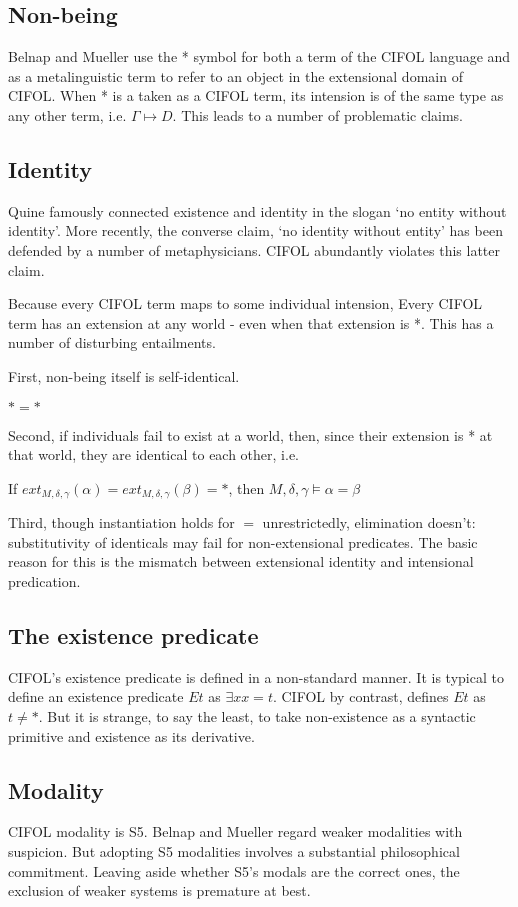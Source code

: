 \documentclass[]{article}
\begin{document}
\subsection{Non-being}
Belnap and Mueller use the * symbol for both a term of the CIFOL language and as a metalinguistic term to refer to an object in the extensional domain of CIFOL. When * is a taken as a CIFOL term, its intension is of the same type as any other term, i.e. $\Gamma \mapsto D$. This leads to a number of problematic claims. 

\subsection{Identity}
Quine famously connected existence and identity in the slogan `no entity without identity'. More recently, the converse claim, `no identity without entity' has been defended by a number of metaphysicians. CIFOL abundantly violates this latter claim.

Because every CIFOL term maps to some individual intension, Every CIFOL term has an extension at any world - even when that extension is *. This has a number of disturbing entailments. 

First, non-being itself is self-identical.

$*=*$

Second, if individuals fail to exist at a world, then, since their extension is * at that world, they are identical to each other, i.e. 

If $ext_{M, \delta, \gamma}(\alpha)=ext_{M, \delta, \gamma}(\beta)=*$, then $M, \delta, \gamma \models \alpha = \beta$

Third, though instantiation holds for $=$ unrestrictedly, elimination doesn't: substitutivity of identicals may fail for non-extensional predicates. The basic reason for this is the mismatch between extensional identity and intensional predication.

\subsection{The existence predicate}
CIFOL's existence predicate is defined in a non-standard manner. It is typical to define an existence predicate $Et$ as $\exists x x=t$. CIFOL by contrast, defines $Et$ as $t \ne *$. But it is strange, to say the least, to take non-existence as a syntactic primitive and existence as its derivative.

\subsection{Modality}
CIFOL modality is S5. Belnap and Mueller regard weaker modalities with suspicion. But adopting S5 modalities involves a substantial philosophical commitment. Leaving aside whether S5's modals are the correct ones, the exclusion of weaker systems is premature at best.
\end{document}
